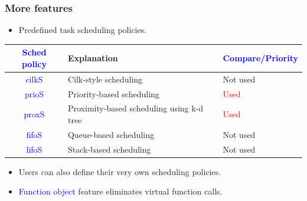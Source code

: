 \documentclass{beamer}
\newcommand{\tablefont}{\fontsize{8}{13}\selectfont}
\begin{document}
\begin{frame}[fragile]
\frametitle{More features}
\begin{itemize}
\item Predefined task scheduling policies.
\end{itemize}
\begin{center}
\tablefont
\begin{tabular}{|c|l|l|}
\hline
\textcolor{blue}{Sched policy} & Explanation & \textcolor{blue}{Compare/Priority} \\
\hline
\textcolor{blue}{cilkS} & Cilk-style scheduling & Not used \\
\hline
\textcolor{blue}{prioS} & Priority-based scheduling & \textcolor{red}{Used} \\
\hline
\textcolor{blue}{proxS} & Proximity-based scheduling using k-d tree & \textcolor{red}{Used} \\
\hline
\textcolor{blue}{fifoS} & Queue-based scheduling & Not used \\
\hline
\textcolor{blue}{lifoS} & Stack-based scheduling & Not used \\
\hline
\end{tabular}
\normalsize
\end{center}
\begin{itemize}
\item Users can also define their very own scheduling policies.
\item \textcolor{blue}{Function object} feature eliminates virtual function
      calls.
\end{itemize}
\end{frame}
\end{document}
